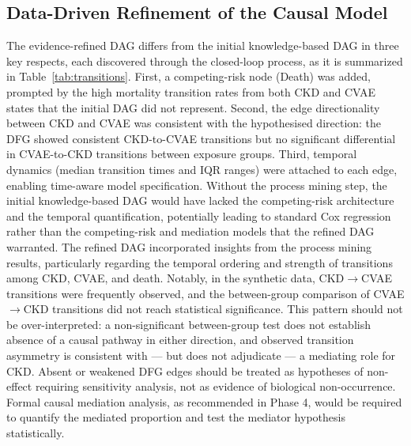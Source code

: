 \documentclass[sn-vancouver-num]{sn-jnl}
\begin{document}
\subsection{Data-Driven Refinement of the Causal Model}
The evidence-refined DAG differs from the initial knowledge-based DAG in three key respects, each discovered through the closed-loop process, as it is summarized in Table~\ref{tab:transitions}. First, a competing-risk node (Death) was added, prompted by the high mortality transition rates from both CKD and CVAE states that the initial DAG did not represent. Second, the edge directionality between CKD and CVAE was consistent with the hypothesised direction: the DFG showed consistent CKD-to-CVAE transitions but no significant differential in CVAE-to-CKD transitions between exposure groups. Third, temporal dynamics (median transition times and IQR ranges) were attached to each edge, enabling time-aware model specification. Without the process mining step, the initial knowledge-based DAG would have lacked the competing-risk architecture and the temporal quantification, potentially leading to standard Cox regression rather than the competing-risk and mediation models that the refined DAG warranted. The refined DAG incorporated insights from the process mining results, particularly regarding the temporal ordering and strength of transitions among CKD, CVAE, and death. Notably, in the synthetic data, CKD$\rightarrow$CVAE transitions were frequently observed, and the between-group comparison of CVAE$\rightarrow$CKD transitions did not reach statistical significance. This pattern should not be over-interpreted: a non-significant between-group test does not establish absence of a causal pathway in either direction, and observed transition asymmetry is consistent with --- but does not adjudicate --- a mediating role for CKD. Absent or weakened DFG edges should be treated as hypotheses of non-effect requiring sensitivity analysis, not as evidence of biological non-occurrence. Formal causal mediation analysis, as recommended in Phase 4, would be required to quantify the mediated proportion and test the mediator hypothesis statistically.
\end{document}
